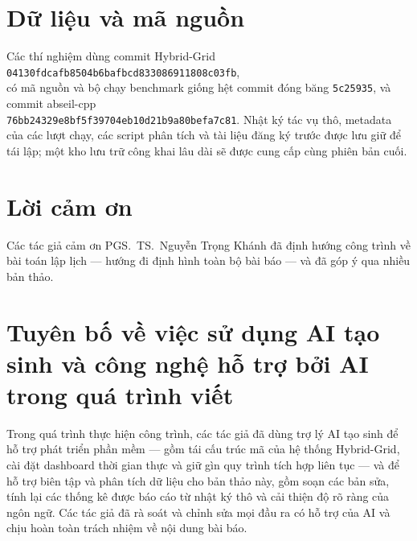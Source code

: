 \documentclass[final,5p,times,twocolumn]{elsarticle}
\begin{document}
\section*{Dữ liệu và mã nguồn}

Các thí nghiệm dùng commit Hybrid-Grid\\ \texttt{04130fdcafb8504b6bafbcd833086911808c03fb},\\ có mã nguồn và bộ chạy benchmark giống hệt commit đóng băng \texttt{5c25935}, và commit abseil-cpp\\ \texttt{76bb24329e8bf5f39704eb10d21b9a80befa7c81}. Nhật ký tác vụ thô, metadata của các lượt chạy, các script phân tích và tài liệu đăng ký trước được lưu giữ để tái lập; một kho lưu trữ công khai lâu dài sẽ được cung cấp cùng phiên bản cuối.

\section*{Lời cảm ơn}

Các tác giả cảm ơn PGS.~TS.~Nguyễn Trọng Khánh đã định hướng công trình về bài toán lập lịch --- hướng đi định hình toàn bộ bài báo --- và đã góp ý qua nhiều bản thảo.

\section*{Tuyên bố về việc sử dụng AI tạo sinh và công nghệ hỗ trợ bởi AI trong quá trình viết}

Trong quá trình thực hiện công trình, các tác giả đã dùng trợ lý AI tạo sinh để hỗ trợ phát triển phần mềm --- gồm tái cấu trúc mã của hệ thống Hybrid-Grid, cài đặt dashboard thời gian thực và giữ gìn quy trình tích hợp liên tục --- và để hỗ trợ biên tập và phân tích dữ liệu cho bản thảo này, gồm soạn các bản sửa, tính lại các thống kê được báo cáo từ nhật ký thô và cải thiện độ rõ ràng của ngôn ngữ. Các tác giả đã rà soát và chỉnh sửa mọi đầu ra có hỗ trợ của AI và chịu hoàn toàn trách nhiệm về nội dung bài báo.
\end{document}
